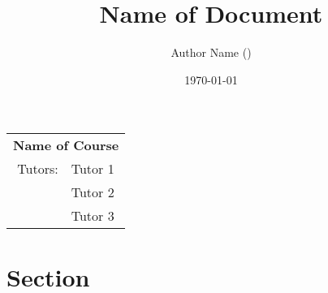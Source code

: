 
\title{Name of Document}
\author{Author Name\texorpdfstring{ ()}{}} %
\date{\today}

\makeatletter
    \let\headerauthor\@author
    \let\headertitle\@title
\makeatother


    \begin{titlepage}
        \hypersetup{pageanchor=false} %
        \maketitle
        \thispagestyle{fancy}
        \rhead{\small\today}
        \begin{abstract}
            \noindent %
        \end{abstract}
        \begin{table}[b]	
            \begin{center}
                \begin{tabular}{rl}
                    \multicolumn{2}{c}{\textbf{Name of Course}}\\
                    Tutors: & Tutor 1\\
                    & Tutor 2\\
                    & Tutor 3
                \end{tabular}
            \end{center}
        \end{table}
    \end{titlepage}
    \clearpage

    \hypersetup{pageanchor=false} %
    \pagestyle{fancy}
    \rhead{\small \headertitle\\\today}
    \lhead{\small \headerauthor}
    \cfoot{\thepage}
    \tableofcontents
    \listoffigures
    \listoftables
    \clearpage

    \hypersetup{pageanchor=true} %
    \section{Section}
        \label{sec:section}

